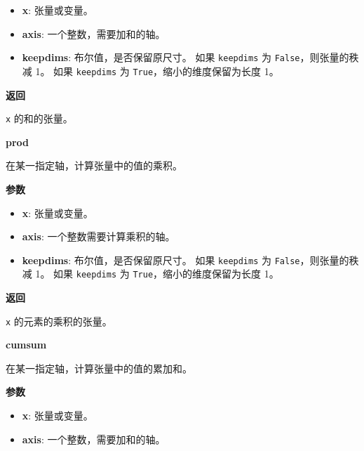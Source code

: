 \begin{itemize}
\tightlist
\item
  \textbf{x}: 张量或变量。
\item
  \textbf{axis}: 一个整数，需要加和的轴。
\item
  \textbf{keepdims}: 布尔值，是否保留原尺寸。 如果 \texttt{keepdims} 为
  \texttt{False}，则张量的秩减 1。 如果 \texttt{keepdims} 为
  \texttt{True}，缩小的维度保留为长度 1。
\end{itemize}

\textbf{返回}

\texttt{x} 的和的张量。


\textbf{prod}\label{prod}

\begin{Shaded}
\begin{Highlighting}[]
\OperatorTok{=}\OperatorTok{=}\NormalTok{)}
\end{Highlighting}
\end{Shaded}

在某一指定轴，计算张量中的值的乘积。

\textbf{参数}

\begin{itemize}
\tightlist
\item
  \textbf{x}: 张量或变量。
\item
  \textbf{axis}: 一个整数需要计算乘积的轴。
\item
  \textbf{keepdims}: 布尔值，是否保留原尺寸。 如果 \texttt{keepdims} 为
  \texttt{False}，则张量的秩减 1。 如果 \texttt{keepdims} 为
  \texttt{True}，缩小的维度保留为长度 1。
\end{itemize}

\textbf{返回}

\texttt{x} 的元素的乘积的张量。


\textbf{cumsum}\label{cumsum}

\begin{Shaded}
\begin{Highlighting}[]
\OperatorTok{=}\NormalTok{)}
\end{Highlighting}
\end{Shaded}

在某一指定轴，计算张量中的值的累加和。

\textbf{参数}

\begin{itemize}
\tightlist
\item
  \textbf{x}: 张量或变量。
\item
  \textbf{axis}: 一个整数，需要加和的轴。
\end{itemize}

